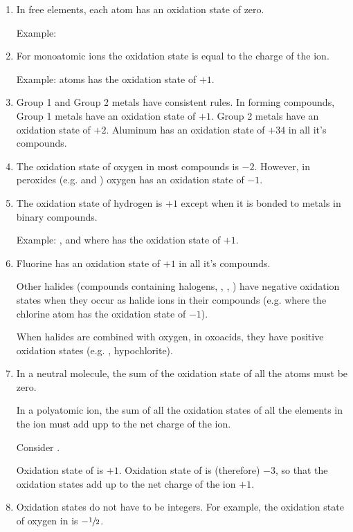 \documentclass[../mit-general-chemistry.tex]{subfiles}
\begin{document}
\begin{enumerate}[label=\arabic*)]
\item In free elements, each atom has an oxidation state of zero.

  Example: 

\item For monoatomic ions the oxidation state is equal to the charge
  of the ion.

  Example:  atoms has the oxidation state of $+1$.

\item Group 1 and Group 2 metals have consistent rules. In forming
  compounds, Group 1 metals have an oxidation state of $+1$. Group 2
  metals have an oxidation state of $+2$. Aluminum has an oxidation
  state of $+34$ in all it's compounds.

\item The oxidation state of oxygen in most compounds is
  $-2$. However, in peroxides (e.g.  and ) oxygen
  has an oxidation state of $-1$.

\item The oxidation state of hydrogen is $+1$ except when it is bonded
  to metals in binary compounds.

  Example: ,  and  where  has the
  oxidation state of $+1$.

\item Fluorine has an oxidation state of $+1$ in all it's compounds.

  Other halides (compounds containing halogens, , , ) have negative oxidation
  states when they occur as halide ions in their compounds
  (e.g.  where the chlorine atom has the oxidation state of
  $-1$).

  When halides are combined with oxygen, in oxoacids, they have
  positive oxidation states (e.g. , hypochlorite).

\item In a neutral molecule, the sum of the oxidation state of all the
  atoms must be zero.

  In a polyatomic ion, the sum of all the oxidation states of all the
  elements in the ion must add upp to the net charge of the ion.  

  \begin{example}
    Consider .
    
    \paragraphbreak
    
    Oxidation state of  is $+1$. Oxidation state of  is
    (therefore) $-3$, so that the oxidation states add up to the net
    charge of the ion $+1$.
  \end{example}


\item Oxidation states do not have to be integers. For example, the
  oxidation state of oxygen in  is $-\sfrac{1}{2}$.

\end{enumerate}
\end{document}
